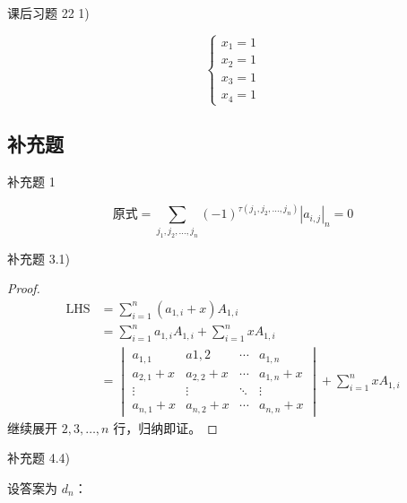 \begin{problem}
	课后习题 22 1)
	\begin{solution}
		$$
		\begin{cases}
			x_1 = 1 \\
			x_2 = 1 \\
			x_3 = 1 \\
			x_4 = 1
		\end{cases}
		$$
	\end{solution}
\end{problem}

\subsection{补充题}

\begin{problem}
	补充题 1
	\begin{solution}
		$$
		\text{原式} = \sum_{j_1,j_2,\dots,j_n} (-1)^{\tau(j_1,j_2,\dots,j_n)} |a_{i,j}|_n = 0
		$$
	\end{solution}
\end{problem}

\begin{problem}
	补充题 3.1)
	\begin{proof}
		$$
		\begin{aligned}
			\text{LHS} & = \sum_{i=1}^n (a_{1,i} + x) A_{1,i} \\
			& = \sum_{i=1}^n a_{1,i} A_{1,i} + \sum_{i=1}^n x A_{1,i} \\
			& = \begin{vmatrix}
				a_{1,1} & a{1,2} & \cdots & a_{1,n} \\
				a_{2,1} + x & a_{2,2} + x & \cdots & a_{1,n} + x \\
				\vdots & \vdots & \ddots & \vdots \\
				a_{n,1} + x & a_{n,2} + x & \cdots & a_{n,n} + x
			\end{vmatrix} + \sum_{i=1}^n x A_{1,i}
		\end{aligned}
		$$
		继续展开 $2,3,\dots,n$ 行，归纳即证。
	\end{proof}
\end{problem}

\begin{problem}
	补充题 4.4)
	\begin{solution}
		设答案为 $d_n$：
	\end{solution}
\end{problem}
